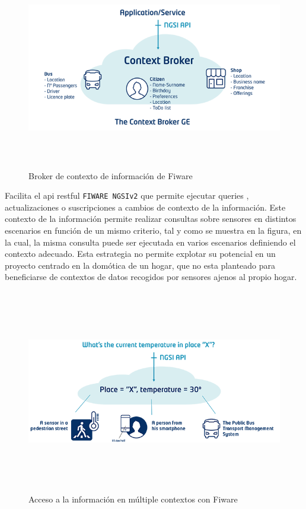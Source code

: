 \vspace{0.5cm}
\begin{figure}[hbt!]
\label{fiwarecontext}
\centering
\includegraphics[height=3.5in]{figures/fiware_context_broker.png}
\caption[Broker de contexto de información de Fiware]{Broker de contexto de información de Fiware}
\end{figure}

Facilita el \gls{api} restful \verb|FIWARE NGSIv2| que permite ejecutar queries , actualizaciones o suscripciones a cambios de contexto de la información. Este contexto de la información permite realizar consultas sobre sensores en distintos escenarios en función de un mismo criterio, tal y como se muestra en la figura, en la cual, la misma consulta puede ser ejecutada en varios escenarios definiendo el contexto adecuado. Esta estrategia no permite explotar su potencial en un proyecto centrado en la domótica de un hogar, que no esta planteado para beneficiarse de contextos de datos recogidos por sensores ajenos al propio hogar.

\vspace{0.5cm}
\begin{figure}[hbt!]
\label{fiwarechangecontext}
\centering
\includegraphics[height=3.5in]{figures/fiware_context_change.png}
\caption[Acceso a la información en múltiple contextos con Fiware]{Acceso a la información en múltiple contextos con Fiware}
\end{figure}


